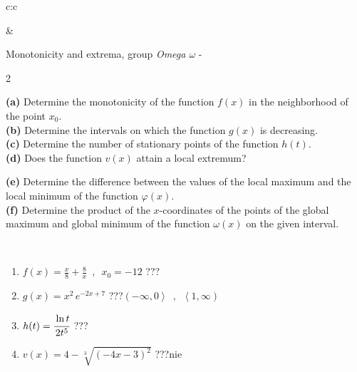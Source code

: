 \documentclass[10pt]{report}
\begin{document}
\begin{tabular}{c:c}
\begin{minipage}[c][104.5mm][t]{0.5\linewidth}
\begin{center}
\end{center}
\end{minipage}
&
\begin{minipage}[c][104.5mm][t]{0.5\linewidth}
\begin{center}
\vspace{5mm}
{\huge Monotonicity and extrema, group \textit{Omega $\omega$} -}\\[5mm]
\begin{minipage}{0.95\linewidth}
\begin{center}
{\small \begin{multicols}{2} \raggedright
\textbf{(a)} Determine the monotonicity of the function \(f(x)\) in the neighborhood of the point \(x_0\). \\[1mm]
\textbf{(b)} Determine the intervals on which the function \(g(x)\) is decreasing. \\[1mm]
\textbf{(c)} Determine the number of stationary points of the function \(h(t)\). \\[1mm]
\textbf{(d)} Does the function \(v(x)\) attain a local extremum? \par \columnbreak
\textbf{(e)} Determine the difference between the values of the local maximum and the local minimum of the function \(\varphi(x)\). \\[1mm]
\textbf{(f)} Determine the product of the \(x\)-coordinates of the points of the global maximum and global minimum of the function \(\omega(x)\) on the given interval. \\[1mm]
\end{multicols}
}
\end{center}
\end{minipage}
\\[1mm]
\begin{minipage}{0.79\linewidth}
\begin{center}
\begin{varwidth}{\linewidth}
\setlength{\itemsep}{0pt}
\begin{enumerate}
\normalsize
\item $f(x)=\frac{x}{8}+\frac{8}{x} \enspace , \enspace x_0=-12$\quad \dotfill\; ???\;\dotfill \quad {}
\item $g(x)=x^2\, e^{-2x+7}$\quad \dotfill\; ???\;\dotfill \quad $\left(-\infty , 0\right\rangle\enspace , \enspace \left\langle1 , \infty\right)$
\item $h(t)=\cfrac{\ln t}{2t^5}$\quad \dotfill\; ???\;\dotfill {}
\item $v(x)=4-\sqrt[3]{(-4x-3)^2}$\quad \dotfill\; ???\;\dotfill \quad $\text{nie}$

\end{enumerate}
\end{varwidth}
\end{center}
\end{minipage}
\end{center}
\end{minipage}
\end{tabular}
\end{document}
